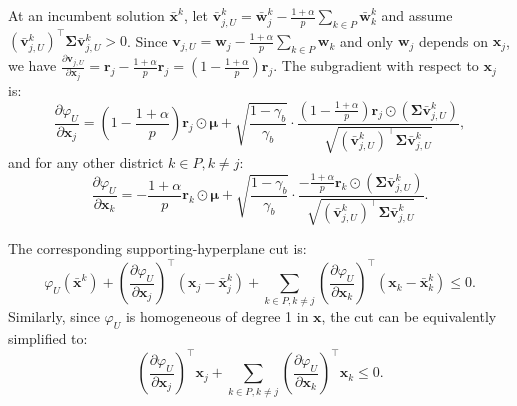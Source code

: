 \documentclass[preprint,12pt,authoryear]{elsarticle}
\begin{document}
At an incumbent solution $\bar{\mathbf{x}}^k$, let $\bar{\mathbf{v}}_{j,U}^k = \bar{\mathbf{w}}_j^k - \frac{1+\alpha}{p} \sum_{k \in P} \bar{\mathbf{w}}_k^k$ and assume $(\bar{\mathbf{v}}_{j,U}^k)^{\top} \boldsymbol{\Sigma} \bar{\mathbf{v}}_{j,U}^k > 0$. Since $\mathbf{v}_{j,U} = \mathbf{w}_j - \frac{1+\alpha}{p} \sum_{k \in P} \mathbf{w}_k$ and only $\mathbf{w}_j$ depends on $\mathbf{x}_j$, we have $\frac{\partial \mathbf{v}_{j,U}}{\partial \mathbf{x}_j} = \mathbf{r}_j - \frac{1+\alpha}{p} \mathbf{r}_j = \left(1 - \frac{1+\alpha}{p}\right) \mathbf{r}_j$. The subgradient with respect to $\mathbf{x}_j$ is:
\begin{equation}
\frac{\partial \varphi_U}{\partial \mathbf{x}_j} = \left(1 - \frac{1+\alpha}{p}\right) \mathbf{r}_j \odot \boldsymbol{\mu} + \sqrt{\frac{1-\gamma_b}{\gamma_b}} \cdot \frac{\left(1 - \frac{1+\alpha}{p}\right) \mathbf{r}_j \odot (\boldsymbol{\Sigma} \bar{\mathbf{v}}_{j,U}^k)}{\sqrt{(\bar{\mathbf{v}}_{j,U}^k)^{\top} \boldsymbol{\Sigma} \bar{\mathbf{v}}_{j,U}^k}},
\label{eq:rel_workload_subgradient_U_j}
\end{equation}
and for any other district $k \in P, k \neq j$:
\begin{equation}
\frac{\partial \varphi_U}{\partial \mathbf{x}_k} = -\frac{1+\alpha}{p} \mathbf{r}_k \odot \boldsymbol{\mu} + \sqrt{\frac{1-\gamma_b}{\gamma_b}} \cdot \frac{-\frac{1+\alpha}{p} \mathbf{r}_k \odot (\boldsymbol{\Sigma} \bar{\mathbf{v}}_{j,U}^k)}{\sqrt{(\bar{\mathbf{v}}_{j,U}^k)^{\top} \boldsymbol{\Sigma} \bar{\mathbf{v}}_{j,U}^k}}.
\label{eq:rel_workload_subgradient_U_k}
\end{equation}

The corresponding supporting-hyperplane cut is:
\begin{equation}
\varphi_U(\bar{\mathbf{x}}^k) + \left(\frac{\partial \varphi_U}{\partial \mathbf{x}_j}\right)^\top (\mathbf{x}_j - \bar{\mathbf{x}}_j^k) + \sum_{k \in P, k \neq j} \left(\frac{\partial \varphi_U}{\partial \mathbf{x}_k}\right)^\top (\mathbf{x}_k - \bar{\mathbf{x}}_k^k) \leqslant 0.
\label{eq:rel_workload_d1_supporting_cut_upper}
\end{equation}
Similarly, since $\varphi_U$ is homogeneous of degree 1 in $\mathbf{x}$, the cut can be equivalently simplified to:
\begin{equation}
\left(\frac{\partial \varphi_U}{\partial \mathbf{x}_j}\right)^\top \mathbf{x}_j + \sum_{k \in P, k \neq j} \left(\frac{\partial \varphi_U}{\partial \mathbf{x}_k}\right)^\top \mathbf{x}_k \leqslant 0.
\end{equation}
\end{document}

